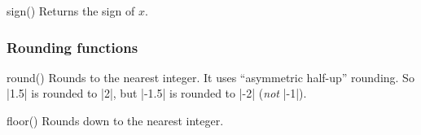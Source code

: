 \begin{math-function}{sign()}
\mathcommand
    Returns the sign of $x$.
\begin{codeexample}[]
 \pgfmathresult
\end{codeexample}

\begin{codeexample}[]
 \pgfmathresult
\end{codeexample}

\begin{codeexample}[]
 \pgfmathresult
\end{codeexample}
\end{math-function}


\subsubsection{Rounding functions}
\label{pgfmath-functions-rounding}

\begin{math-function}{round()}
\mathcommand
    Rounds  to the nearest integer. It uses ``asymmetric half-up''
    rounding. So |1.5| is rounded to |2|, but |-1.5| is rounded to |-2|
    (\emph{not} |-1|).
\begin{codeexample}[]
 \pgfmathresult
\end{codeexample}

\begin{codeexample}[]
 \pgfmathresult
\end{codeexample}
\end{math-function}

\begin{math-function}{floor()}
\mathcommand
    Rounds  down to the nearest integer.
\begin{codeexample}[]
 \pgfmathresult
\end{codeexample}

\begin{codeexample}[]
 \pgfmathresult
\end{codeexample}

\begin{codeexample}[]
 \pgfmathresult
\end{codeexample}
\end{math-function}

